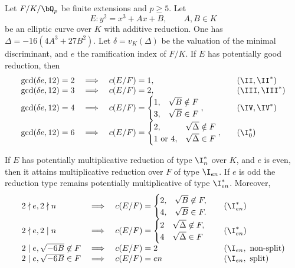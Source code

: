 \begin{lemma}\label{lem_add_tam}\label{tamagawa-num}\cite[Lemma 3.22]{reg-const}
    Let $F /K / \bQ_p$ be finite extensions and $p \geq 5$. Let
    $$E \colon  y^2 = x^3 + Ax + B, \qquad A, B \in K$$
    be an elliptic curve over $K$ with additive reduction. One has $\Delta = -16(4A^3 + 27 B^2)$. Let $\delta=v_K(\Delta)$ be the valuation of the minimal discriminant, and $e$ the ramification index of $F/K$.
    If $E$ has potentially good reduction, then 
        \[
        \begin{array}{l l l l}
            \gcd(\delta e, 12) = 2 & \implies & c(E / F) = 1, & \quad (\II, \II^*) \\
            \gcd(\delta e, 12) = 3 & \implies & c(E / F) = 2, & \quad (\III, \III^*) \\
            \gcd(\delta e, 12) = 4 & \implies & c(E / F) = \begin{cases} 1, & \sqrt{B} \notin F
                                \\ 3, & \sqrt{B} \in F \end{cases}, & \quad (\IV, \IV^*) \\
            \gcd(\delta e, 12) = 6 & \implies & c(E / F) = \begin{cases} 2, & \sqrt{\Delta} \notin F
                \\ 1 \ \text{or} \ 4, & \sqrt{\Delta} \in F \end{cases}, & \quad (\I_0^*) 
        \end{array}
        \]
     
        If $E$ has potentially multiplicative reduction of type $\I_n^*$ over $K$,
        and $e$ is even, then it attains multiplicative reduction over $F$ of type $\I_{en}$. If $e$ is odd the reduction type remains potentially multiplicative of type $\I_{en}^*$. Moreover, 
        \[
            \begin{array}{l l l l}
                2 \nmid e, 2 \nmid n & \implies & c(E / F) = \begin{cases} 2, & \sqrt{B} \not\in F, \\ 4, & \sqrt{B} \in F. \end{cases} & \quad (\I_{en}^*) \\
                2 \nmid e, 2 \mid n & \implies & c(E / F) = \begin{cases} 2 & \sqrt{\Delta} \not\in F, \\ 4 & \sqrt{\Delta} \in F \end{cases} & \quad ({\I_{en}^*}) \\
                2 \mid e, \sqrt{-6 B} \not\in F & \implies & c(E / F ) = 2 & \quad (\I_{en}, \text{ non-split}) \\
                2 \mid e, \sqrt{-6 B} \in F & \implies & c(E / F) = en & \quad (\I_{en}, \text{ split})
                \end{array} 
            \]
\end{lemma}

